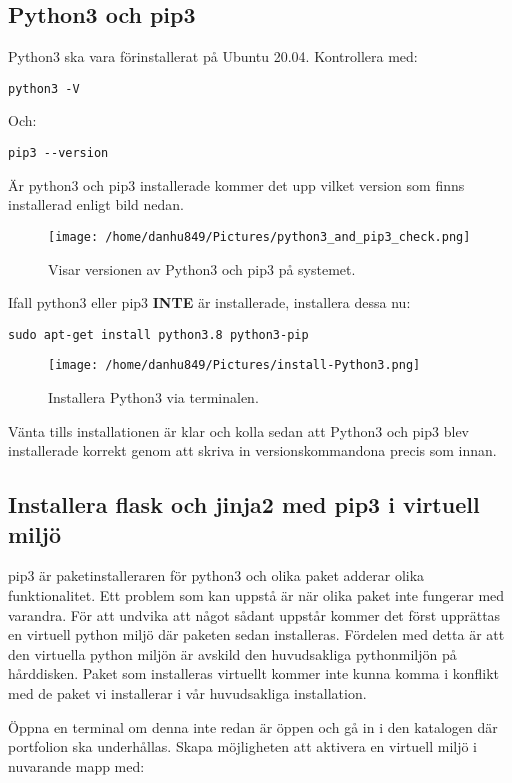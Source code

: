 \documentclass{TDP003mall}
\begin{document}
\subsection{Python3 och pip3}
Python3 ska vara förinstallerat på Ubuntu 20.04. Kontrollera med:

\texttt{python3 -V}

Och:

\texttt{pip3 \texttt{-{}-}version}

Är python3 och pip3 installerade kommer det upp vilket version som finns installerad enligt bild nedan.

\begin{figure}[h]
  \centerline{\texttt{[image: /home/danhu849/Pictures/python3\_and\_pip3\_check.png]}}
  \caption{Visar versionen av Python3 och pip3 på systemet.}
  \label{fig}
\end{figure}

Ifall python3 eller pip3 \textbf{INTE} är installerade, installera dessa nu:

\texttt{sudo apt-get install python3.8 python3-pip}

\begin{figure}[h]
  \centerline{\texttt{[image: /home/danhu849/Pictures/install-Python3.png]}}
  \caption{Installera Python3 via terminalen.}
  \label{fig}
\end{figure}

Vänta tills installationen är klar och kolla sedan att Python3 och pip3 blev installerade korrekt genom att skriva in versionskommandona precis som innan.

\subsection{Installera flask och jinja2 med pip3 i virtuell miljö}
pip3 är paketinstalleraren för python3 och olika paket adderar olika funktionalitet. Ett problem som kan uppstå är när olika paket inte fungerar med varandra. För att undvika att något sådant uppstår kommer det först upprättas en virtuell python miljö där paketen sedan installeras. Fördelen med detta är att den virtuella python miljön är avskild den huvudsakliga pythonmiljön på hårddisken. Paket som installeras virtuellt kommer inte kunna komma i konflikt med de paket vi installerar i vår huvudsakliga installation.

Öppna en terminal om denna inte redan är öppen och gå in i den katalogen där portfolion ska underhållas. Skapa möjligheten att aktivera en virtuell miljö i nuvarande mapp med:
\end{document}

